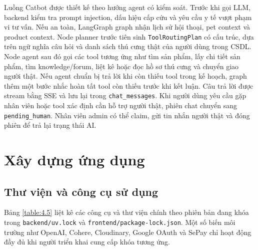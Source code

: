 \documentclass[../DoAn.tex]{subfiles}
\begin{document}
Luồng Catbot được thiết kế theo hướng agent có kiểm soát. Trước khi gọi LLM, backend kiểm tra prompt injection, dấu hiệu cấp cứu và yêu cầu y tế vượt phạm vi tư vấn. Nếu an toàn, LangGraph graph nhận lịch sử hội thoại, pet context và product context. Node planner trước tiên sinh \texttt{ToolRoutingPlan} có cấu trúc, dựa trên ngữ nghĩa câu hỏi và danh sách thú cưng thật của người dùng trong CSDL. Node agent sau đó gọi các tool tương ứng như tìm sản phẩm, lấy chi tiết sản phẩm, tìm knowledge/forum, liệt kê hoặc đọc hồ sơ thú cưng và chuyển giao người thật. Nếu agent chuẩn bị trả lời khi còn thiếu tool trong kế hoạch, graph thêm một bước nhắc hoàn tất tool còn thiếu trước khi kết luận. Câu trả lời được stream bằng SSE và lưu lại trong \texttt{chat\_messages}. Khi người dùng yêu cầu gặp nhân viên hoặc tool xác định cần hỗ trợ người thật, phiên chat chuyển sang \texttt{pending\_human}. Nhân viên admin có thể claim, gửi tin nhắn người thật và đóng phiên để trả lại trạng thái AI.

\section{Xây dựng ứng dụng}
\label{section:4.3}

\subsection{Thư viện và công cụ sử dụng}
\label{subsection:4.3.1}

Bảng \ref{table:4.5} liệt kê các công cụ và thư viện chính theo phiên bản đang khóa trong \texttt{backend/uv.lock} và \texttt{frontend/package-lock.json}. Một số biến môi trường như OpenAI, Cohere, Cloudinary, Google OAuth và SePay chỉ hoạt động đầy đủ khi người triển khai cung cấp khóa tương ứng.
\end{document}
